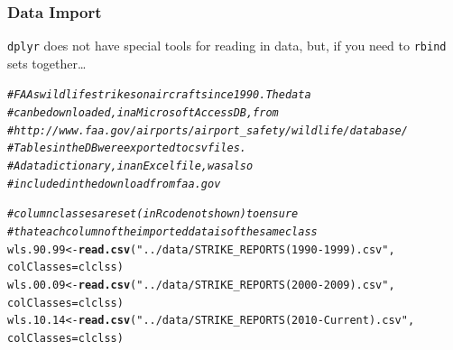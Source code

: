 \documentclass{beamer}\usepackage[]{graphicx}\usepackage[]{color}
\makeatletter
\newcommand{\hlstr}[1]{\textcolor[rgb]{0.192,0.494,0.8}{#1}}%
\newcommand{\hlcom}[1]{\textcolor[rgb]{0.678,0.584,0.686}{\textit{#1}}}%
\newcommand{\hlstd}[1]{\textcolor[rgb]{0.345,0.345,0.345}{#1}}%
\newcommand{\hlkwb}[1]{\textcolor[rgb]{0.69,0.353,0.396}{#1}}%
\newcommand{\hlkwc}[1]{\textcolor[rgb]{0.333,0.667,0.333}{#1}}%
\newcommand{\hlkwd}[1]{\textcolor[rgb]{0.737,0.353,0.396}{\textbf{#1}}}%
\newenvironment{kframe}{%
 \def\at@end@of@kframe{}%
 \ifinner\ifhmode%
  \def\at@end@of@kframe{\end{minipage}}%
  \begin{minipage}{\columnwidth}%
 \fi\fi%
 \def\FrameCommand##1{\hskip\@totalleftmargin \hskip-\fboxsep
 \colorbox{shadecolor}{##1}\hskip-\fboxsep
     \hskip-\linewidth \hskip-\@totalleftmargin \hskip\columnwidth}%
 \MakeFramed {\advance\hsize-\width
   \@totalleftmargin\z@ \linewidth\hsize
   \@setminipage}}%
 {\par\unskip\endMakeFramed%
 \at@end@of@kframe}
\newenvironment{knitrout}{}{} %
\makeatother
\begin{document}
\begin{frame}[fragile]
  \frametitle{Data Import}
  {\tt dplyr} does not have special tools for reading in data, but, if you need
  to {\tt rbind} sets together\ldots 



\begin{knitrout}\footnotesize
{}\color{fgcolor}\begin{kframe}
\begin{alltt}
\hlcom{# FAAs wildlife strikes on aircraft since 1990.  The data}
\hlcom{# can be downloaded, in a Microsoft Access DB,  from}
\hlcom{# http://www.faa.gov/airports/airport_safety/wildlife/database/}
\hlcom{# Tables in the DB were exported to csv files.  }
\hlcom{# A data dictionary, in an Excel file, was also}
\hlcom{# included in the download from faa.gov}

\hlcom{# column classes are set (in R code not shown) to ensure}
\hlcom{# that each column of the imported data is of the same class}
\hlstd{wls.90.99} \hlkwb{<-} \hlkwd{read.csv}\hlstd{(}\hlstr{"../data/STRIKE_REPORTS (1990-1999).csv"}\hlstd{,}
                      \hlkwc{colClasses} \hlstd{= clclss)}
\hlstd{wls.00.09} \hlkwb{<-} \hlkwd{read.csv}\hlstd{(}\hlstr{"../data/STRIKE_REPORTS (2000-2009).csv"}\hlstd{,}
                      \hlkwc{colClasses} \hlstd{= clclss)}
\hlstd{wls.10.14} \hlkwb{<-} \hlkwd{read.csv}\hlstd{(}\hlstr{"../data/STRIKE_REPORTS (2010-Current).csv"}\hlstd{,}
                      \hlkwc{colClasses} \hlstd{= clclss)}
\end{alltt}
\end{kframe}
\end{knitrout}
\end{frame} 
\end{document}
